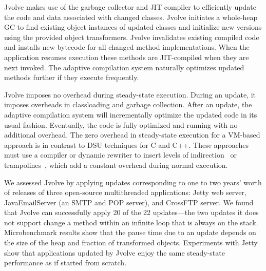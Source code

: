 \documentclass[9pt]{sigplanconf}
\newcommand{\DSU}{{\sc Jvolve}}
\begin{document}
\DSU{} makes use of the garbage collector and JIT compiler to
efficiently update the code and data associated with changed classes.
\DSU{} initiates a whole-heap GC to find existing object
instances of updated classes and initialize new versions using the
provided object transformers.  \DSU{} invalidates existing compiled 
code and installs new bytecode for all changed method implementations.
When the application resumes execution these methods
are JIT-compiled when they are next invoked.
The adaptive compilation system naturally optimizes updated methods
further if they execute frequently.

\DSU{} imposes no overhead during steady-state execution.  During an
update, it imposes overheads in 
classloading and garbage collection. After an update, the adaptive
compilation system will incrementally optimize the updated code in its
usual fashion.  Eventually, the code is fully optimized and running
with no additional overhead.  The zero overhead in steady-state
execution for a
VM-based approach is in contrast to DSU techniques for C and C++. These
approaches
must use a compiler or dynamic rewriter to insert levels of
indirection~\cite{neamtiu06dsu, orso:java} or
trampolines~\cite{chen06vee,chen:icse07,altekar05opus,ksplice}, which
add a constant overhead during normal execution.

We assessed \DSU{} by applying updates corresponding to
one to two years' worth of releases of three open-source
multithreaded applications: Jetty web server,
JavaEmailServer (an SMTP and POP server), and CrossFTP server.  We
found that \DSU{}
can successfully apply 20 of the 22 updates---the two updates it does
not support change a method within an infinite loop that is always on the
stack.
Microbenchmark results show that the pause time due to an
update depends on the size of the heap and fraction of transformed
objects. 
Experiments
with Jetty show that applications updated by \DSU{} enjoy the same
steady-state performance as if started from scratch.
\end{document}
